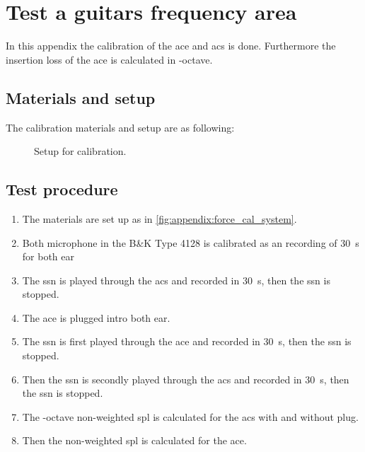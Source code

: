 \chapter{Test a guitars frequency area}
In this appendix the calibration of the \gls{ace} and \gls{acs} is done. Furthermore the insertion loss of the \gls{ace} is calculated in -octave.

\section*{Materials and setup}
The calibration materials and setup are as following:


\startequipment
{}
\stopequipment


\begin{figure}[H]
\centering
\def\svgwidth{\columnwidth}

\caption{Setup for calibration.}
		\label{fig:appendix:force_cal_system}
\end{figure}

\section*{Test procedure}


\begin{enumerate}
\item The materials are set up as in \autoref{fig:appendix:force_cal_system}.
\item Both microphone in the B\&K Type 4128 is calibrated as an recording of \SI{30}{\second} for both ear
\item The \gls{ssn} is played through the \gls{acs} and recorded in \SI{30}{\second}, then the \gls{ssn} is stopped.
\item The \gls{ace} is plugged intro both ear. 
\item The \gls{ssn} is first played through the \gls{ace} and recorded in \SI{30}{\second}, then the \gls{ssn} is stopped.
\item Then the \gls{ssn} is secondly played through the \gls{acs} and recorded in \SI{30}{\second}, then the \gls{ssn} is stopped.
\item The -octave non-weighted \gls{spl} is calculated for the \gls{acs} with and without plug. 
\item Then the non-weighted \gls{spl} is calculated for the \gls{ace}.
\end{enumerate}

